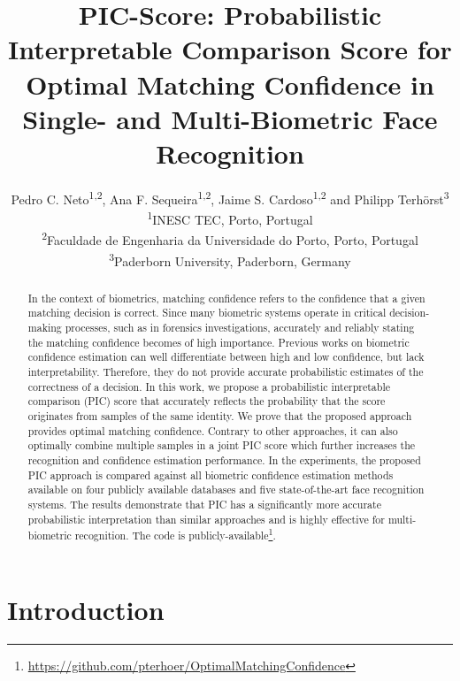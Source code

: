 \documentclass[10pt,twocolumn,letterpaper]{article}
\begin{document}
\title{PIC-Score: Probabilistic Interpretable Comparison Score for Optimal Matching Confidence in Single- and
Multi-Biometric Face Recognition}



\author{Pedro C. Neto\textsuperscript{1,2}, Ana F. Sequeira\textsuperscript{1,2}, Jaime S. Cardoso\textsuperscript{1,2} and Philipp Terh\"{o}rst\textsuperscript{3}\\
\textsuperscript{1}INESC TEC, Porto, Portugal\\
\textsuperscript{2}Faculdade de Engenharia da Universidade do Porto, Porto, Portugal\\
\textsuperscript{3}Paderborn University, Paderborn, Germany}
\maketitle
\begin{abstract}

In the context of biometrics, matching confidence refers to the confidence that a given matching decision is correct.
Since many biometric systems operate in critical decision-making processes, such as in forensics investigations, accurately and reliably stating the matching confidence becomes of high importance.
Previous works on biometric confidence estimation can well differentiate between high and low confidence, but lack interpretability.
Therefore, they do not provide accurate probabilistic estimates of the correctness of a decision.
In this work, we propose a probabilistic interpretable comparison (PIC) score that accurately reflects the probability that the score originates from samples of the same identity.
We prove that the proposed approach provides optimal matching confidence. 
Contrary to other approaches, it can also optimally combine multiple samples in a joint PIC score which further increases the recognition and confidence estimation performance.
In the experiments, the proposed PIC approach is compared against all biometric confidence estimation methods available on four publicly available databases and five state-of-the-art face recognition systems.
The results demonstrate that PIC has a significantly more accurate probabilistic interpretation than similar approaches and is highly effective for multi-biometric recognition.
The code is publicly-available\footnote{\url{https://github.com/pterhoer/OptimalMatchingConfidence} 
}.

\end{abstract}

\section{Introduction}
\label{sec:Introduction}
\end{document}
